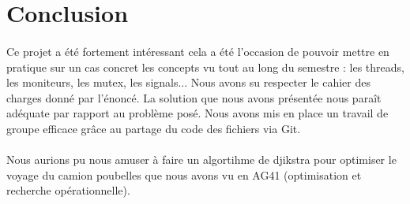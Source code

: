 \documentclass[12pt]{article}
\begin{document}
\section{Conclusion}
\paragraph{}Ce projet a été fortement intéressant cela a été l'occasion de pouvoir mettre en pratique sur un cas concret les concepts vu tout au long du semestre : les threads, les moniteurs, les mutex, les signals... Nous avons su respecter le cahier des charges donné par l'énoncé. La solution que nous avons présentée nous paraît adéquate par rapport au problème posé. Nous avons mis en place un travail de groupe efficace grâce au partage du code des fichiers via Git.
\paragraph{}Nous aurions pu nous amuser à faire un algortihme de djikstra pour optimiser le voyage du camion poubelles que nous avons vu en AG41 (optimisation et recherche opérationnelle).
\end{document}
